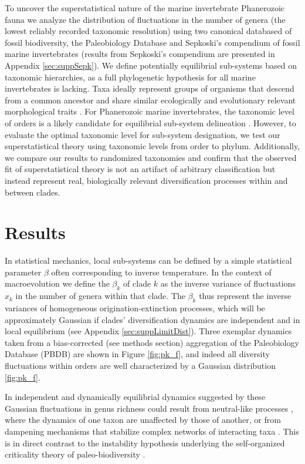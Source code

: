 \documentclass[12pt]{article}
\let\citep=\autocite
\begin{document}
To uncover the superstatistical nature of the marine invertebrate
Phanerozoic fauna we analyze the distribution of fluctuations in the
number of genera (the lowest reliably recorded taxonomic resolution)
using two canonical databased of fossil biodiversity, the Paleobiology
Database \citep[PBDB;][]{alroy08} and Sepkoski's compendium
\citep{sepkoski1992} of fossil marine invertebrates (results from
Sepkoski's compendium are presented in Appendix \ref{sec:suppSepk}).
We define potentially equilibrial sub-systems based on taxonomic
hierarchies, as a full phylogenetic hypothesis for all marine
invertebrates is lacking.  Taxa ideally represent groups of organisms
that descend from a common ancestor and share similar ecologically and
evolutionary relevant morphological traits \citep{mayr1965systZool,
  erwin2007}.  For Phanerozoic marine invertebrates, the taxonomic
level of orders is a likely candidate for equilibrial sub-system
delineation \citep{holman1989}. However, to evaluate the optimal
taxonomic level for sub-system designation, we test our
superstatistical theory using taxonomic levels from order to
phylum. Additionally, we compare our results to randomized taxonomies
and confirm that the observed fit of superstatistical theory is not an
artifact of arbitrary classification but instead represent real,
biologically relevant diversification processes within and between
clades.

\section*{Results}

In statistical mechanics, local sub-systems can be defined by a simple
statistical parameter $\beta$ often corresponding to inverse
temperature. In the context of macroevolution we define the $\beta_k$
of clade $k$ as the inverse variance of fluctuations $x_k$ in the
number of genera within that clade.  The $\beta_k$ thus represent the
inverse variances of homogeneous origination-extinction processes,
which will be approximately Gaussian if clades' diversification
dynamics are independent and in local equilibrium (see Appendix
\ref{sec:suppLimitDist}).  Three exemplar dynamics taken from a
bias-corrected (see methods section) aggregation of the Paleobiology
Database (PBDB) \citep{alroy08} are shown in Figure \ref{fig:pk_f},
and indeed all diversity fluctuations within orders are well
characterized by a Gaussian distribution \ref{fig:pk_f}.

In independent and dynamically equilibrial dynamics suggested by these
Gaussian fluctuations in genus richness could result from neutral-like
processes \citep{hubbell2001}, where the dynamics of one taxon are
unaffected by those of another, or from dampening mechanisms that
stabilize complex networks of interacting taxa \citep{brose2005}. This
is in direct contrast to the instability hypothesis underlying the
self-organized criticality theory of paleo-biodiversity
\citep{bak1993, sole1997}.
\end{document}
